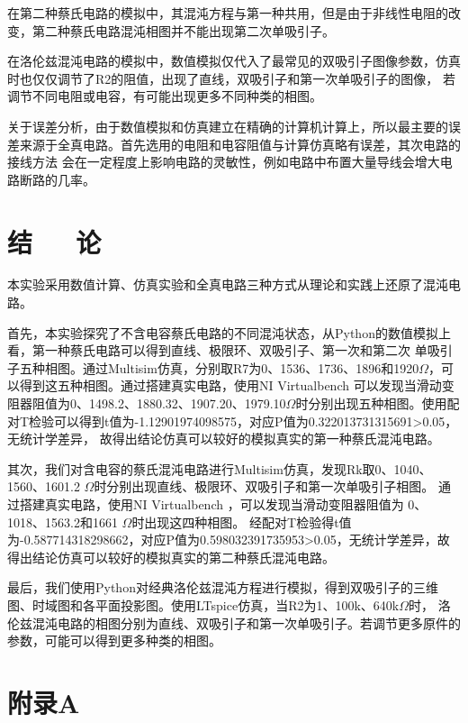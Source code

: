 \documentclass[10pt,a4paper,twoside,UTF8]{ctexart}
\begin{document}
在第二种蔡氏电路的模拟中，其混沌方程与第一种共用，但是由于非线性电阻的改变，第二种蔡氏电路混沌相图并不能出现第二次单吸引子。

在洛伦兹混沌电路的模拟中，数值模拟仅代入了最常见的双吸引子图像参数，仿真时也仅仅调节了R2的阻值，出现了直线，双吸引子和第一次单吸引子的图像，
若调节不同电阻或电容，有可能出现更多不同种类的相图。

关于误差分析，由于数值模拟和仿真建立在精确的计算机计算上，所以最主要的误差来源于全真电路。首先选用的电阻和电容阻值与计算仿真略有误差，其次电路的接线方法
会在一定程度上影响电路的灵敏性，例如电路中布置大量导线会增大电路断路的几率。


\section{结~~~论}
本实验采用数值计算、仿真实验和全真电路三种方式从理论和实践上还原了混沌电路。

首先，本实验探究了不含电容蔡氏电路的不同混沌状态，从Python的数值模拟上看，第一种蔡氏电路可以得到直线、极限环、双吸引子、第一次和第二次
单吸引子五种相图。通过Multisim仿真，分别取R7为0、1536、1736、1896和1920$\Omega$，可以得到这五种相图。通过搭建真实电路，使用NI Virtualbench
可以发现当滑动变阻器阻值为0、1498.2、1880.32、1907.20、1979.10$\Omega$时分别出现五种相图。使用配对T检验可以得到t值为-1.12901974098575，对应P值为0.322013731315691>0.05，无统计学差异，
故得出结论仿真可以较好的模拟真实的第一种蔡氏混沌电路。

其次，我们对含电容的蔡氏混沌电路进行Multisim仿真，发现Rk取0、1040、1560、1601.2 $\Omega$时分别出现直线、极限环、双吸引子和第一次单吸引子相图。
通过搭建真实电路，使用NI Virtualbench ，可以发现当滑动变阻器阻值为 0、1018、1563.2和1661 $\Omega$时出现这四种相图。
经配对T检验得t值为-0.587714318298662，对应P值为0.598032391735953>0.05，无统计学差异，故得出结论仿真可以较好的模拟真实的第二种蔡氏混沌电路。

最后，我们使用Python对经典洛伦兹混沌方程进行模拟，得到双吸引子的三维图、时域图和各平面投影图。使用LTspice仿真，当R2为1、100k、640k$\Omega$时，
洛伦兹混沌电路的相图分别为直线、双吸引子和第一次单吸引子。若调节更多原件的参数，可能可以得到更多种类的相图。

\newpage
% 
% 

\printbibliography[title=参考文献] 
\clearpage

	
\section*{\LARGE 附录A}
\end{document}
